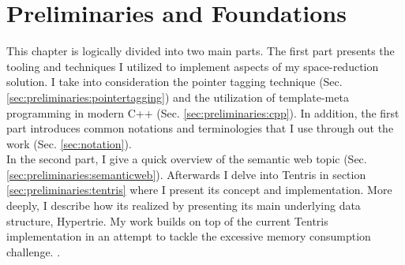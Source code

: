 \chapter{Preliminaries and Foundations}
\label{ch:preliminaries}

This chapter is logically divided into two main parts. The first part presents the tooling and techniques I utilized to implement aspects of my space-reduction solution. I take into consideration the pointer tagging technique (Sec. \ref{sec:preliminaries:pointertagging}) and the utilization of template-meta programming in modern C++ (Sec. \ref{sec:preliminaries:cpp}). In addition, the first part introduces common notations and terminologies that I  use through out the work (Sec. \ref{sec:notation}). \\ 

In the second part, I give a quick overview of the semantic web topic (Sec. \ref{sec:preliminaries:semanticweb}). Afterwards I delve into Tentris in section \ref{sec:preliminaries:tentris} where I present its concept and implementation. More deeply, I describe how its realized by presenting its main underlying data structure, Hypertrie. My work builds on top of the current Tentris implementation in an attempt to tackle the excessive memory consumption challenge. .





